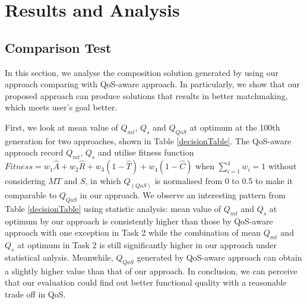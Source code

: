 \documentclass{IEEEtran}
\begin{document}
\section{Results and Analysis}\label{results_analysis}
\subsection{Comparison Test}\label{comparisonTest}
In this section, we analyse the composition solution generated by using our approach comparing with QoS-aware approach. In particularly, we show that our proposed approach can produce solutions that results in better matchmaking, which meets user's goal better.
 
First, we look at mean value of $Q_{mt}$, $Q_{s}$ and $Q_{QoS}$ at optimum at the 100th generation for two approaches, shown in Table \ref{decisionTable}. The QoS-aware approach record $Q_{mt}$, $Q_{s}$ and utilise fitness function $Fitness = w_1 \hat{A} + w_2 \hat{R} + w_3(1 - \hat{T}) + w_4(1 - \hat{C})$ when $\sum_{i=1}^{4} w_i = 1$ without considering $MT$ and $S$, in which $Q_(QoS)$ is normalised from 0 to 0.5 to make it comparable to $Q_{QoS}$ in our approach. We observe an interesting pattern from Table \ref{decisionTable} using statistic analysis: mean value of $Q_{mt}$ and $Q_{s}$ at optimum by our approach is consistently higher than those by QoS-aware approach with one exception in Task 2 while the combination of mean $Q_{mt}$ and $Q_{s}$ at optimum in Task 2 is still significantly higher in our approach under statistical anlysis. Meanwhile, $Q_{QoS}$ generated by QoS-aware approach can obtain a slightly higher value than that of our approach. In conclusion, we can perceive that our evaluation could find out better functional quality with a reasonable trade off in QoS.
\end{document}
